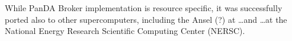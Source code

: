 While PanDA Broker implementation is resource specific, it was successfully
ported also to other supercomputers, including the Ansel (?) at \ldots and
\ldots at the National Energy Research Scientific Computing Center (NERSC).






